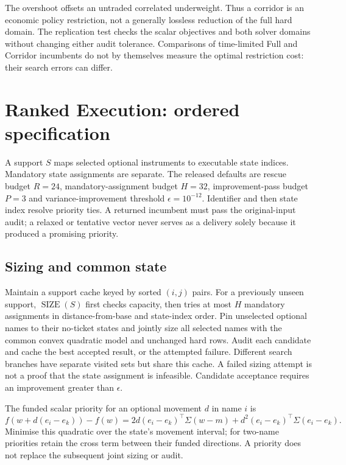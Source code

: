 \documentclass[11pt]{article}
\newcommand{\SIZE}{\operatorname{SIZE}}
\begin{document}
The overshoot offsets an untraded correlated underweight. Thus a corridor is
an economic policy restriction, not a generally lossless reduction of the
full hard domain. The replication test checks the scalar objectives and both
solver domains without changing either audit tolerance. Comparisons of
time-limited Full and Corridor incumbents do not by themselves measure the
optimal restriction cost: their search errors can differ.

\section{Ranked Execution: ordered specification}
A support $S$ maps selected optional instruments to executable state indices.
Mandatory state assignments are separate. The released defaults are rescue
budget $R=24$, mandatory-assignment budget $H=32$, improvement-pass budget
$P=3$ and variance-improvement threshold $\epsilon=10^{-12}$.
Identifier and then state index resolve priority ties. A returned incumbent
must pass the original-input audit; a relaxed or tentative vector never serves
as a delivery solely because it produced a promising priority.

\subsection{Sizing and common state}
Maintain a support cache keyed by sorted $(i,j)$ pairs. For a previously unseen
support, $\SIZE(S)$ first checks capacity, then tries at most $H$ mandatory
assignments in distance-from-base and state-index order. Pin unselected
optional names to their no-ticket states and jointly size all selected names
with the common convex quadratic model and unchanged hard rows. Audit each
candidate and cache the best accepted result, or the attempted failure.
Different search branches have separate visited sets but share this cache.
A failed sizing attempt is not a proof that the state assignment is infeasible.
Candidate acceptance requires an improvement greater than $\epsilon$.

The funded scalar priority for an optional movement $d$ in name $i$ is
\[
 f(w+d(e_i-e_k))-f(w)
 =2d(e_i-e_k)^\top\Sigma(w-m)
  +d^2(e_i-e_k)^\top\Sigma(e_i-e_k).
\]
Minimise this quadratic over the state's movement interval; for two-name
priorities retain the cross term between their funded directions. A priority
does not replace the subsequent joint sizing or audit.
\end{document}
